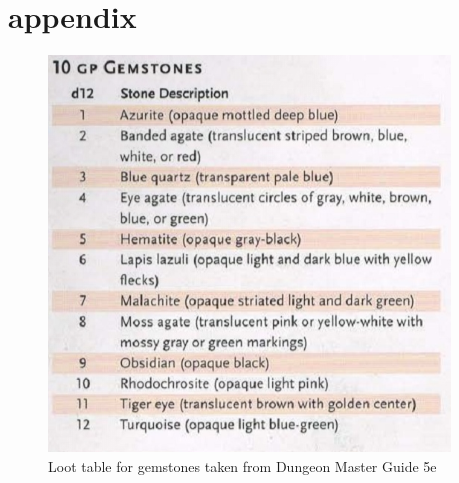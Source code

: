 \documentclass{UoYCSproject}
\begin{document}
\chapter{appendix}
\label{cha:aB}
\begin{figure}[htb]
  \centering
    \includegraphics[width=\textwidth]{figures/gemstone_table.png}
    \caption{Loot table for gemstones taken from Dungeon Master Guide 5e}
    \label{fig:loot_table}
\end{figure}
\end{document}
